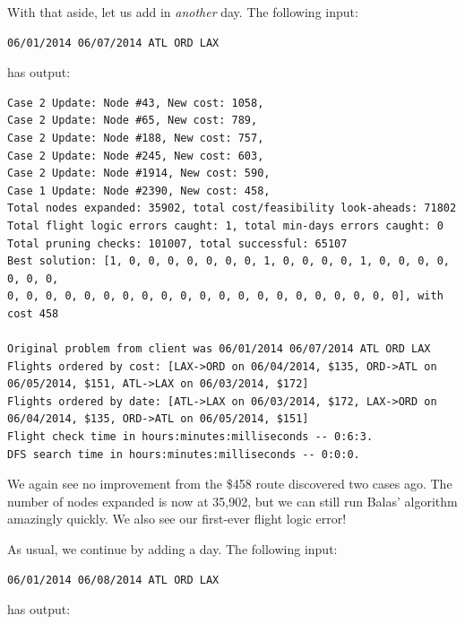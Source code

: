 \documentclass{article}
\begin{document}
With that aside, let us add in \emph{another} day. The following input:

\begin{verbatim}
06/01/2014 06/07/2014 ATL ORD LAX
\end{verbatim}

has output:

\scriptsize
\begin{verbatim}
Case 2 Update: Node #43, New cost: 1058, 
Case 2 Update: Node #65, New cost: 789, 
Case 2 Update: Node #188, New cost: 757, 
Case 2 Update: Node #245, New cost: 603, 
Case 2 Update: Node #1914, New cost: 590, 
Case 1 Update: Node #2390, New cost: 458, 
Total nodes expanded: 35902, total cost/feasibility look-aheads: 71802
Total flight logic errors caught: 1, total min-days errors caught: 0
Total pruning checks: 101007, total successful: 65107
Best solution: [1, 0, 0, 0, 0, 0, 0, 0, 1, 0, 0, 0, 0, 1, 0, 0, 0, 0, 0, 0, 0, 
0, 0, 0, 0, 0, 0, 0, 0, 0, 0, 0, 0, 0, 0, 0, 0, 0, 0, 0, 0, 0], with cost 458

Original problem from client was 06/01/2014 06/07/2014 ATL ORD LAX
Flights ordered by cost: [LAX->ORD on 06/04/2014, $135, ORD->ATL on 06/05/2014, $151, ATL->LAX on 06/03/2014, $172]
Flights ordered by date: [ATL->LAX on 06/03/2014, $172, LAX->ORD on 06/04/2014, $135, ORD->ATL on 06/05/2014, $151]
Flight check time in hours:minutes:milliseconds -- 0:6:3.
DFS search time in hours:minutes:milliseconds -- 0:0:0.
\end{verbatim}
\normalsize

We again see no improvement from the \$458 route discovered two cases ago. The number of nodes expanded is now at 35,902, but we can still run Balas'
algorithm amazingly quickly. We also see our first-ever flight logic error!

As usual, we continue by adding a day. The following input:

\begin{verbatim}
06/01/2014 06/08/2014 ATL ORD LAX
\end{verbatim}

has output:
\end{document}
